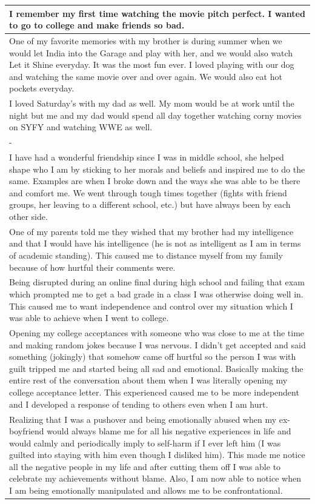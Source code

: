 \documentclass[
  .7em,
  letterpaper,
  DIV=11,
  numbers=noendperiod]{scrartcl}
\begin{document}
\begin{table}
\begin{tabular}{l}
\hline
I remember my first time watching the movie pitch perfect. I wanted to go to college and make friends so bad.\\
\hline
One of my favorite memories with my brother is during summer when we would let India into the Garage and play with her, and we would also watch Let it Shine everyday. It was the most fun ever. I loved playing with our dog and watching the same movie over and over again. We would also eat hot pockets everyday.\\
\hline
I loved Saturday's with my dad as well. My mom would be at work until the night but me and my dad would spend all day together watching corny movies on SYFY and watching WWE as well.\\
\hline
-\\
\hline
I have had a wonderful friendship since I was in middle school, she helped shape who I am by sticking to her morals and beliefs and inspired me to do the same. Examples are when I broke down and the ways she was able to be there and comfort me. We went through tough times together (fights with friend groups, her leaving to a different school, etc.) but have always been by each other side.\\
\hline
One of my parents told me they wished that my brother had my intelligence and that I would have his intelligence (he is not as intelligent as I am in terms of academic standing). This caused me to distance myself from my family because of how hurtful their comments were.\\
\hline
Being disrupted during an online final during high school and failing that exam which prompted me to get a bad grade in a class I was otherwise doing well in. This caused me to want independence and control over my situation which I was able to achieve when I went to college.\\
\hline
Opening my college acceptances with someone who was close to me at the time and making random jokes because I was nervous. I didn't get accepted and said something (jokingly) that somehow came off hurtful so the person I was with guilt tripped me and started being all sad and emotional. Basically making the entire rest of the conversation about them when I was literally opening my college acceptance letter. This experienced caused me to be more independent and I developed a response of tending to others even when I am hurt.\\
\hline
Realizing that I was a pushover and being emotionally abused when my ex-boyfriend would always blame me for all his negative experiences in life and would calmly and periodically imply to self-harm if I ever left him (I was guilted into staying with him even though I disliked him). This made me notice all the negative people in my life and after cutting them off I was able to celebrate my achievements without blame. Also, I am now able to notice when I am being emotionally manipulated and allows me to be confrontational.\\

\end{tabular}
\end{table}
\end{document}
